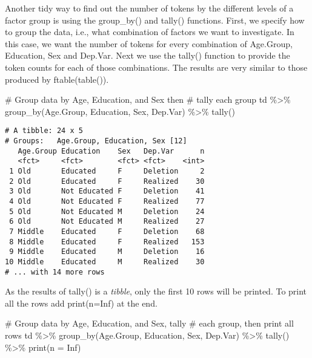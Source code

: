\documentclass[
  12pt,
  letterpaper]{article}
\newenvironment{Shaded}{\begin{snugshade}}{\end{snugshade}}
\newcommand{\AttributeTok}[1]{\textcolor[rgb]{0.40,0.45,0.13}{#1}}
\newcommand{\CommentTok}[1]{\textcolor[rgb]{0.37,0.37,0.37}{#1}}
\newcommand{\ConstantTok}[1]{\textcolor[rgb]{0.56,0.35,0.01}{#1}}
\newcommand{\FunctionTok}[1]{\textcolor[rgb]{0.28,0.35,0.67}{#1}}
\newcommand{\NormalTok}[1]{\textcolor[rgb]{0.00,0.23,0.31}{#1}}
\newcommand{\SpecialCharTok}[1]{\textcolor[rgb]{0.37,0.37,0.37}{#1}}
\renewcommand\texttt[1]{{\ttfamily\color{BrickRed}#1}}
\begin{document}
Another \texttt{tidy} way to find out the number of tokens by the
different levels of a factor group is using the \texttt{group\_by()} and
\texttt{tally()} functions. First, we specify how to group the data,
i.e., what combination of factors we want to investigate. In this case,
we want the number of tokens for every combination of
\texttt{Age.Group}, \texttt{Education}, \texttt{Sex} and
\texttt{Dep.Var}. Next we use the \texttt{tally()} function to provide
the token counts for each of those combinations. The results are very
similar to those produced by \texttt{ftable(table())}.

\begin{Shaded}
\begin{Highlighting}[]
\CommentTok{\# Group data by Age, Education, and Sex then}
\CommentTok{\# tally each group}
\NormalTok{td }\SpecialCharTok{\%\textgreater{}\%}
    \FunctionTok{group\_by}\NormalTok{(Age.Group, Education, Sex, Dep.Var) }\SpecialCharTok{\%\textgreater{}\%}
    \FunctionTok{tally}\NormalTok{()}
\end{Highlighting}
\end{Shaded}

\begin{verbatim}
# A tibble: 24 x 5
# Groups:   Age.Group, Education, Sex [12]
   Age.Group Education    Sex   Dep.Var      n
   <fct>     <fct>        <fct> <fct>    <int>
 1 Old       Educated     F     Deletion     2
 2 Old       Educated     F     Realized    30
 3 Old       Not Educated F     Deletion    41
 4 Old       Not Educated F     Realized    77
 5 Old       Not Educated M     Deletion    24
 6 Old       Not Educated M     Realized    27
 7 Middle    Educated     F     Deletion    68
 8 Middle    Educated     F     Realized   153
 9 Middle    Educated     M     Deletion    16
10 Middle    Educated     M     Realized    30
# ... with 14 more rows
\end{verbatim}

As the results of \texttt{tally()} is a \emph{tibble}, only the first 10
rows will be printed. To print all the rows add \texttt{print(n=Inf)} at
the end.

\begin{Shaded}
\begin{Highlighting}[]
\CommentTok{\# Group data by Age, Education, and Sex, tally}
\CommentTok{\# each group, then print all rows}
\NormalTok{td }\SpecialCharTok{\%\textgreater{}\%}
    \FunctionTok{group\_by}\NormalTok{(Age.Group, Education, Sex, Dep.Var) }\SpecialCharTok{\%\textgreater{}\%}
    \FunctionTok{tally}\NormalTok{() }\SpecialCharTok{\%\textgreater{}\%}
    \FunctionTok{print}\NormalTok{(}\AttributeTok{n =} \ConstantTok{Inf}\NormalTok{)}
\end{Highlighting}
\end{Shaded}
\end{document}
